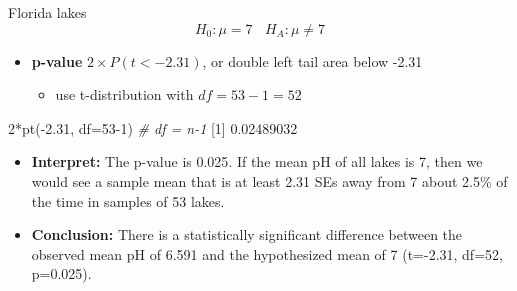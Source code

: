 \documentclass[
  10pt,
  ignorenonframetext,
]{beamer}
\newenvironment{Shaded}{\begin{snugshade}}{\end{snugshade}}
\newcommand{\AttributeTok}[1]{\textcolor[rgb]{0.77,0.63,0.00}{#1}}
\newcommand{\CommentTok}[1]{\textcolor[rgb]{0.56,0.35,0.01}{\textit{#1}}}
\newcommand{\DecValTok}[1]{\textcolor[rgb]{0.00,0.00,0.81}{#1}}
\newcommand{\FloatTok}[1]{\textcolor[rgb]{0.00,0.00,0.81}{#1}}
\newcommand{\FunctionTok}[1]{\textcolor[rgb]{0.00,0.00,0.00}{#1}}
\newcommand{\NormalTok}[1]{#1}
\newcommand{\SpecialCharTok}[1]{\textcolor[rgb]{0.00,0.00,0.00}{#1}}
\providecommand{\tightlist}{%
  \setlength{\itemsep}{0pt}\setlength{\parskip}{0pt}}
\let\oldShaded\Shaded
\let\endoldShaded\endShaded
\renewenvironment{Shaded}{\tiny\oldShaded}{\endoldShaded}
\begin{document}
\begin{frame}[fragile]{Florida lakes}
\protect\hypertarget{florida-lakes-3}{}
\[
H_0: \mu = 7 \ \ \ \  H_A: \mu \neq 7
\]

\begin{itemize}
\tightlist
\item
  \textbf{p-value} \(2 \times P(t < -2.31)\), or double left tail area
  below -2.31

  \begin{itemize}
  \tightlist
  \item
    use t-distribution with \(df = 53-1= 52\)
  \end{itemize}
\end{itemize}

\begin{Shaded}
\begin{Highlighting}[]
\DecValTok{2}\SpecialCharTok{*}\FunctionTok{pt}\NormalTok{(}\SpecialCharTok{{-}}\FloatTok{2.31}\NormalTok{, }\AttributeTok{df=}\DecValTok{53{-}1}\NormalTok{)  }\CommentTok{\# df = n{-}1}
\NormalTok{[}\DecValTok{1}\NormalTok{] }\FloatTok{0.02489032}
\end{Highlighting}
\end{Shaded}

\begin{itemize}
\item
  \textbf{Interpret:} The p-value is 0.025. If the mean pH of all lakes
  is 7, then we would see a sample mean that is at least 2.31 SEs away
  from 7 about 2.5\% of the time in samples of 53 lakes.
\item
  \textbf{Conclusion:} There is a statistically significant difference
  between the observed mean pH of 6.591 and the hypothesized mean of 7
  (t=-2.31, df=52, p=0.025).
\end{itemize}
\end{frame}
\end{document}
